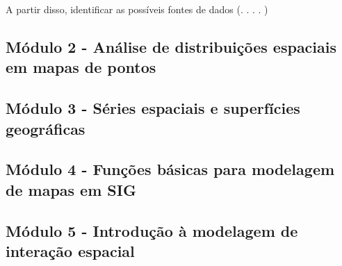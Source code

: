 A partir disso, identificar as possíveis fontes de dados (. . . . )

\subsection{Módulo 2 - Análise de distribuições espaciais em mapas de pontos}

\subsection{Módulo 3 - Séries espaciais e superfícies geográficas}

\subsection{Módulo 4 - Funções básicas para modelagem de mapas em SIG}

\subsection{Módulo 5 - Introdução à modelagem de interação espacial}



